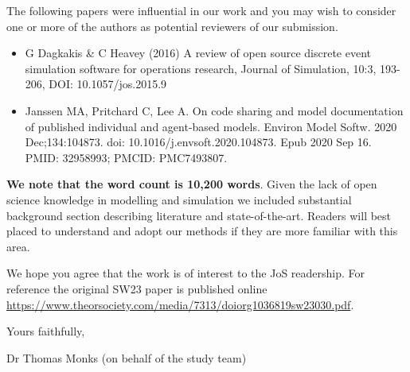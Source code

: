 \documentclass{article}
\begin{document}
The following papers were influential in our work and you may wish to consider one or more of the authors as potential reviewers of our submission.

\begin{itemize}
    \item G Dagkakis \& C Heavey (2016) A review of open source discrete event simulation software for operations research, Journal of Simulation, 10:3, 193-206, DOI: 10.1057/jos.2015.9 
    \item Janssen MA, Pritchard C, Lee A. On code sharing and model documentation of published individual and agent-based models. Environ Model Softw. 2020 Dec;134:104873. doi: 10.1016/j.envsoft.2020.104873. Epub 2020 Sep 16. PMID: 32958993; PMCID: PMC7493807.
\end{itemize}
 
\textbf{We note that the word count is 10,200 words}.  Given the lack of open science knowledge in modelling and simulation we included substantial background section describing literature and state-of-the-art. Readers will best placed to understand and adopt our methods if they are more familiar with this area.

We hope you agree that the work is of interest to the JoS readership.  For reference the original SW23 paper is published online \url{https://www.theorsociety.com/media/7313/doiorg1036819sw23030.pdf}.

\vspace{0.5cm}


\noindent Yours faithfully,

\vspace{0.5cm}
\noindent Dr Thomas Monks (on behalf of the study team)
\end{document}
